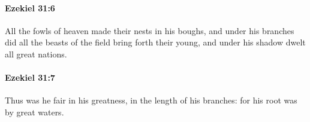 		\paragraph{Ezekiel 31:6} %
			\label{EZEKIEL-31-6}

			All the fowls of heaven made their nests in his boughs, and under his branches did all the beasts of the field bring forth their young, and under his shadow dwelt all great nations.


		\paragraph{Ezekiel 31:7} %
			\label{EZEKIEL-31-7}

			Thus was he fair in his greatness, in the length of his branches: for his root was by great waters.


